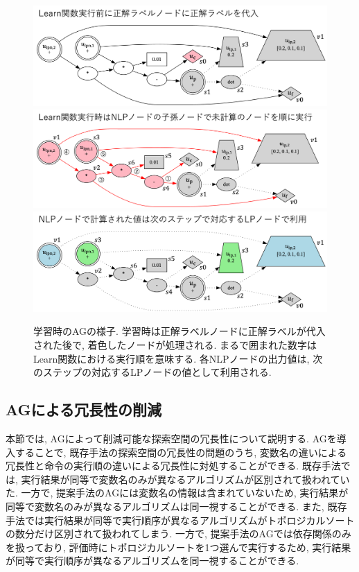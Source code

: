 \documentclass[11pt,oneside,openany,report]{jsbook}
\begin{document}
\begin{figure}
  \includegraphics[width=14cm]{mgg_automl_zero_vag/ag/before_learn.png}
  \includegraphics[width=14cm]{mgg_automl_zero_vag/ag/learn.png}
  \includegraphics[width=14cm]{mgg_automl_zero_vag/ag/after_learn.png}
  \caption{学習時のAGの様子. 学習時は正解ラベルノードに正解ラベルが代入された後で, 着色したノードが処理される. まるで囲まれた数字はLearn関数における実行順を意味する. 各NLPノードの出力値は, 次のステップの対応するLPノードの値として利用される.}
  \label{fig:mgg_automl_zero_vag:learn}
\end{figure}

\subsection{AGによる冗長性の削減} \label{subsec:proposed:ag:redundancy}
本節では, AGによって削減可能な探索空間の冗長性について説明する. AGを導入することで, 既存手法の探索空間の冗長性の問題のうち, 変数名の違いによる冗長性と命令の実行順の違いによる冗長性に対処することができる. 既存手法では, 実行結果が同等で変数名のみが異なるアルゴリズムが区別されて扱われていた. 一方で, 提案手法のAGには変数名の情報は含まれていないため, 実行結果が同等で変数名のみが異なるアルゴリズムは同一視することができる. また, 既存手法では実行結果が同等で実行順序が異なるアルゴリズムがトポロジカルソートの数分だけ区別されて扱われてしまう. 一方で, 提案手法のAGでは依存関係のみを扱っており, 評価時にトポロジカルソートを1つ選んで実行するため, 実行結果が同等で実行順序が異なるアルゴリズムを同一視することができる.
\end{document}
